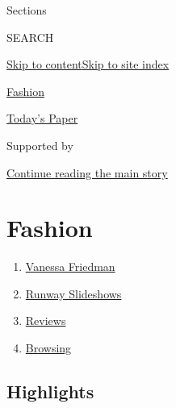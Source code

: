 Sections

SEARCH

\protect\hyperlink{site-content}{Skip to
content}\protect\hyperlink{site-index}{Skip to site index}

\href{https://www.nytimes3xbfgragh.onion/section/fashion}{Fashion}

\href{https://myaccount.nytimes3xbfgragh.onion/auth/login?response_type=cookie\&client_id=vi}{}

\href{https://www.nytimes3xbfgragh.onion/section/todayspaper}{Today's
Paper}

Supported by

\protect\hyperlink{after-sponsor}{Continue reading the main story}

\hypertarget{fashion}{%
\section{Fashion}\label{fashion}}

\begin{enumerate}
\def\labelenumi{\arabic{enumi}.}
\tightlist
\item
  \href{/by/vanessa-friedman}{Vanessa Friedman}
\item
  \href{/spotlight/fashion-runway-slideshows}{Runway Slideshows}
\item
  \href{/spotlight/fashion-reviews}{Reviews}
\item
  \href{/column/browsing}{Browsing}
\end{enumerate}

\hypertarget{highlights}{%
\subsection{Highlights}\label{highlights}}

